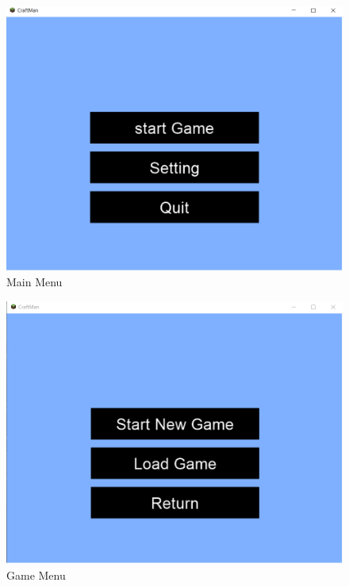 \documentclass[12pt, titlepage]{article}
\begin{document}
\begin{figure}[h]
\centering
\includegraphics[scale=0.25]{mainmenu}
\caption{Main Menu}
\end{figure}
\FloatBarrier
\begin{figure}[h]
\centering
\includegraphics[scale=0.25]{gamemenu}
\caption{Game Menu}
\end{figure}
\FloatBarrier
\FloatBarrier
\end{document}
